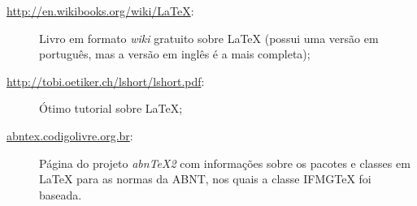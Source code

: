 \begin{description}
 \item[\url{http://en.wikibooks.org/wiki/LaTeX}:] Livro em formato \textit{wiki} gratuito sobre {\LaTeX} (possui uma versão em português, mas a versão em inglês é a mais completa);
 \item[\url{http://tobi.oetiker.ch/lshort/lshort.pdf}:] Ótimo tutorial sobre {\LaTeX};
 \item[\url{abntex.codigolivre.org.br}:] Página do projeto \textit{abnTeX2} com informações sobre os pacotes e classes em {\LaTeX} para as normas da ABNT, nos quais a classe {IFMG\TeX} foi baseada.
\end{description}

